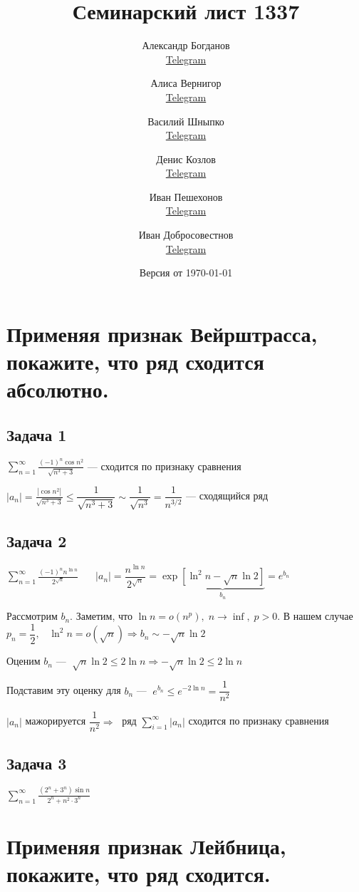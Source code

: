 \documentclass[a4paper,fleqn]{article}
\title{Семинарский лист 1337}
\author{
	Александр Богданов \\ \href{https://t.me/SphericalPotatoInVacuum}{Telegram} \and
	Алиса Вернигор     \\ \href{https://t.me/allisyonok}{Telegram} \and
	Василий Шныпко     \\ \href{https://t.me/yourvash}{Telegram} \and
	Денис Козлов       \\ \href{https://t.me/DKozl50}{Telegram} \and
	Иван Пешехонов     \\ \href{https://t.me/JohanDDC}{Telegram}\and
	Иван Добросовестнов \\ \href{https://t.me/ivankot13}{Telegram}
}
\date{Версия от {\ddmmyyyydate\today} \currenttime}
\begin{document}
	\maketitle
	\section*{Применяя признак Вейрштрасса, покажите, что ряд сходится абсолютно.}
	\subsection*{Задача 1}
		 $ \sum_{n=1}^{\infty} \frac{(-1)^{n} \cos n^{2}}{\sqrt{n^{3}+3}} $ --- сходится по признаку сравнения
		
		$ |a_n| = \frac{|\cos n^{2}|}{\sqrt{n^{3}+3}} \leq \dfrac{1}{\sqrt{n^{3}+3}} \sim \dfrac{1}{\sqrt{n^3}} = \dfrac{1}{n^{3/2}} $ --- сходящийся ряд
	
	\subsection*{Задача 2}
		$ \sum_{n=1}^{\infty} \frac{(-1)^{n} n^{\ln n}}{2^{\sqrt{n}}} $
		$\; \; \; \; \;  |a_n| = \dfrac{n^{\ln n}}{2^{\sqrt{n}}} = \exp \underbrace{\left[\ln^2 n - \sqrt{n}\ln 2\right]}_{b_n}  = e^{b_n}$
		
		Рассмотрим $ b_n $.
		Заметим, что $ \ln n  = o(n^p), \; n \to \inf, \; p>0$. В нашем случае $ p_n = \dfrac{1}{2}, \; \; \; \ln^2n = o(\sqrt{n}) \Rightarrow b_n \sim -\sqrt{n}\ln 2$ 
		
		Оценим $ b_n $   --- $ \; \sqrt{n}\ln2 \leq 2 \ln n \Rightarrow -\sqrt{n}\ln 2 \leq 2\ln n$
		
		Подставим эту оценку для $ b_n $ --- $\; e^{b_n} \leq e^{-2\ln n}  = \dfrac{1}{n^2}$ 
		
		$ |a_n| $ мажорируется $ \dfrac{1}{n^2} \Rightarrow \;$ ряд $ \sum_{i = 1}^{\infty} |a_n|$ сходится по признаку сравнения 
	\subsection*{Задача 3}
		$ \sum_{n=1}^{\infty} \frac{\left(2^{n}+3^{n}\right) \sin n}{2^{n}+n^{2} \cdot 3^{n}} $
	\section*{Применяя признак Лейбница, покажите, что ряд сходится.}
	
	
\end{document}
